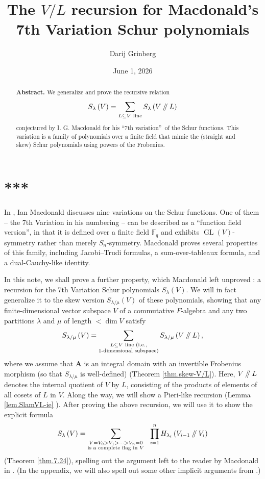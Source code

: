 \documentclass[numbers=enddot,12pt,final,onecolumn,notitlepage]{scrartcl}%
\numberwithin{exer}{section}
\theoremstyle{definition}
\let\sumnonlimits\sum
\let\prodnonlimits\prod
\renewcommand{\sum}{\sumnonlimits\limits}
\renewcommand{\prod}{\prodnonlimits\limits}
\newcommand{\sslash}{\mathbin{/\mkern-5mu/}}
\theoremstyle{plainsl}
\begin{document}
\title{The $V/L$ recursion for Macdonald's 7th Variation Schur polynomials}
\author{Darij Grinberg}
\date{June 1, 2026}
\maketitle

\begin{abstract}
\textbf{Abstract.} We generalize and prove the recursive relation
\[
S_{\lambda}\left(  V\right)  =\sum_{L\subseteq V\text{ line}}S_{\lambda
}\left(  V \mathbin{/\mkern-5mu/} L\right)
\]
conjectured by I. G. Macdonald for his \textquotedblleft7th
variation\textquotedblright\ of the Schur functions. This variation is a
family of polynomials over a finite field that mimic the (straight and skew)
Schur polynomials using powers of the Frobenius.

\end{abstract}

\section*{***}

In \cite{Macdon92}, Ian Macdonald discusses nine variations on the Schur
functions. One of them -- the 7th Variation in his numbering -- can be
described as a \textquotedblleft function field version\textquotedblright, in
that it is defined over a finite field $\mathbb{F}_{q}$ and exhibits
$\operatorname*{GL}\left(  V\right)  $-symmetry rather than merely $S_{n}%
$-symmetry. Macdonald proves several properties of this family, including
Jacobi--Trudi formulas, a sum-over-tableaux formula, and a dual-Cauchy-like identity.

In this note, we shall prove a further property, which Macdonald left unproved
\cite[(7.25 ?)]{Macdon92}: a recursion for the 7th Variation Schur polynomials
$S_{\lambda}\left(  V\right)  $. We will in fact generalize it to the skew
version $S_{\lambda/\mu}\left(  V\right)  $ of these polynomials, showing that
any finite-dimensional vector subspace $V$ of a commutative $F$-algebra and
any two partitions $\lambda$ and $\mu$ of length $<\dim V$ satisfy%
\[
S_{\lambda/\mu}\left(  V\right)  =\sum_{\substack{L\subseteq V\text{ line
(i.e.,}\\1\text{-dimensional subspace)}}}S_{\lambda/\mu}\left(  V\sslash
L\right)  ,
\]
where we assume that $\mathbf{A}$ is an integral domain with an invertible
Frobenius morphism (so that $S_{\lambda/\mu}$ is well-defined) (Theorem
\ref{thm.skew-V/L}). Here, $V\sslash L$ denotes the internal quotient of $V$
by $L$, consisting of the products of elements of all cosets of $L$ in $V$.
Along the way, we will show a Pieri-like recursion (Lemma \ref{lem.SlamVL-ie}%
). After proving the above recursion, we will use it to show the explicit
formula%
\[
S_{\lambda}\left(  V\right)  =\sum_{\substack{V=V_{0}>V_{1}>\cdots
>V_{n}=0\\\text{is a complete flag in }V}}\ \ \prod_{i=1}^{n}H_{\lambda_{i}%
}\left(  V_{i-1}\sslash V_{i}\right)
\]
(Theorem \ref{thm.7.24}), spelling out the argument left to the reader by
Macdonald in \cite{Macdon92}. (In the appendix, we will also spell out some
other implicit arguments from \cite{Macdon92}.)
\end{document}
